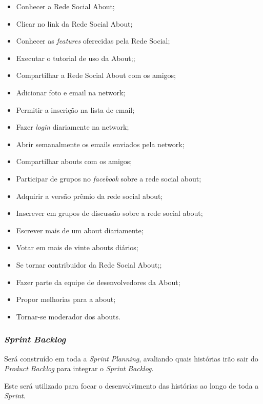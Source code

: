 \begin{itemize}
    \item Conhecer a Rede Social About;
    \item Clicar no link da Rede Social About;
    \item Conhecer as \textit{features} oferecidas pela Rede Social;
    \item Executar o tutorial de uso da About;;
    \item Compartilhar a Rede Social About com os amigos;
    \item Adicionar foto e email na network;
    \item Permitir a inscrição na lista de email;
    \item Fazer \textit{login} diariamente na network;
    \item Abrir semanalmente os emails enviados pela network;
    \item Compartilhar abouts com os amigos;
    \item Participar de grupos no \textit{facebook} sobre a rede social about;
    \item Adquirir a versão prêmio da rede social about;
    \item Inscrever em grupos de discussão sobre a rede social about;
    \item Escrever mais de um about diariamente;
    \item Votar em mais de vinte abouts diários;
    \item Se tornar contribuidor da Rede Social About;;
    \item Fazer parte da equipe de desenvolvedores da About;
    \item Propor melhorias para a about;
    \item Tornar-se moderador dos abouts.
\end{itemize}


\subsubsection{\textit{Sprint} \textit{Backlog}}
\label{subsec:sprintbacklog}
Será construído em toda a \textit{Sprint} \textit{Planning}, avaliando quais histórias irão
sair do \textit{Product} \textit{Backlog} para integrar o \textit{Sprint} \textit{Backlog}.

Este será utilizado para focar o desenvolvimento das histórias ao longo de
toda a \textit{Sprint}.
